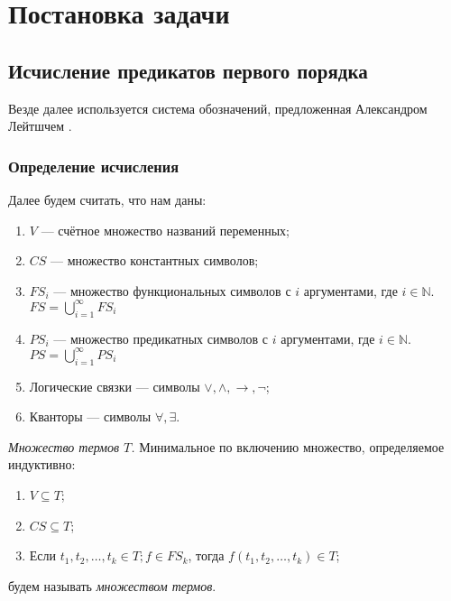 \chapter{Постановка задачи}
\startrelatedwork
\label{sec:chap1}

\section{Исчисление предикатов первого порядка}

Везде далее используется система обозначений, предложенная Александром Лейтшчем \cite{Leitsch:1997:RC:260906}.

\subsection{Определение исчисления}

Далее будем считать, что нам даны:
\begin{enumerate}
	\item $V$    --- счётное множество названий переменных;
    \item $CS$   --- множество константных символов;
    \item $FS_i$ --- множество функциональных символов с $i$ аргументами, где $i \in \mathbb{N}$. \\
    $FS = \bigcup\limits_{i=1}^{\infty} FS_{i}$
    \item $PS_i$ --- множество предикатных символов с $i$ аргументами, где $i \in \mathbb{N}$. \\
    $PS = \bigcup\limits_{i=1}^{\infty} PS_{i}$
    \item Логические связки --- символы $\vee, \wedge, \rightarrow, \neg$;
    \item Кванторы --- символы $\forall, \exists$.
\end{enumerate}



\begin{definition}
  \emph{Множество термов $T$.} Минимальное по включению множество, определяемое индуктивно:
  \begin{enumerate}
  	\item $V \subseteq T$;
    \item $CS \subseteq T$;
    \item Если $t_1, t_2, \ldots, t_k \in T; f \in FS_k$, тогда $f(t_1, t_2, \ldots, t_k) \in T$;
  \end{enumerate}
  будем называть \emph{множеством термов}.
\end{definition}

